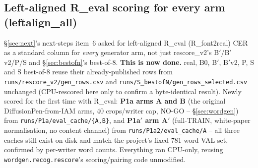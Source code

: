 \documentclass[10.5pt,a4paper]{article}
\newcommand{\fp}[1]{\nolinkurl{#1}}
\newcommand{\Bp}{B$'$}
\begin{document}
\subsection{Left-aligned R\_eval scoring for every arm (leftalign\_all)}
\label{sec:leftalignall}

\S\ref{sec:next}'s next-steps item~6 asked for left-aligned R\_eval (R\_font2real) CER as a standard column for
\emph{every} generator arm, not just rescore\_v2's \Bp/\Bp{}v2/P/S and \S\ref{sec:bestofn}'s best-of-8. \textbf{This is now
done.} real, B0, \Bp, \Bp{}v2, P, S and S best-of-8 reuse their already-published rows from
\fp{runs/rescore_v2/gen_rows.csv} and \fp{runs/S_bestofN/gen_rows_selected.csv} unchanged (CPU-rescored here only to
confirm a byte-identical result). Newly scored for the first time with R\_eval: \textbf{P1a arms A and B} (the original
DiffusionPen-from-IAM arms, 40 crops/writer cap, NO-GO -- \S\ref{sec:wordgen}) from \fp{runs/P1a/eval_cache/\{A,B\}}, and
\textbf{P1a$'$ arm A$'$} (full-TRAIN, white-paper normalisation, no content channel) from \fp{runs/P1a2/eval_cache/A} -- all
three caches still exist on disk and match the project's fixed 781-word VAL set, confirmed by per-writer word counts.
Everything ran CPU-only, reusing \texttt{wordgen.recog.rescore}'s scoring/pairing code unmodified.
\end{document}
